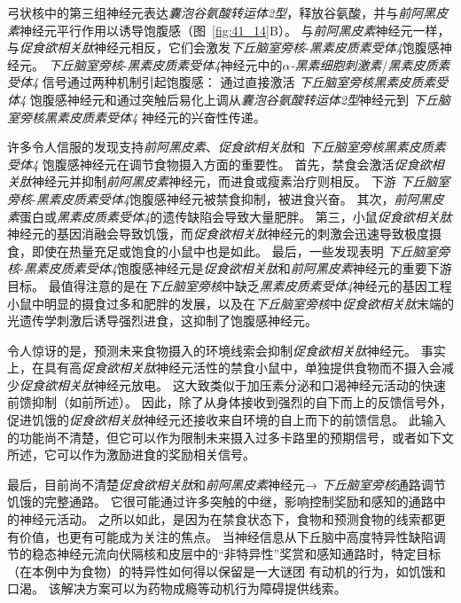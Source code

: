 弓状核中的第三组神经元表达\textit{囊泡谷氨酸转运体2型}，释放谷氨酸，并与\textit{前阿黑皮素}神经元平行作用以诱导饱腹感（图~\ref{fig:41_14}B）。
与\textit{前阿黑皮素}神经元一样，与\textit{促食欲相关肽}神经元相反，它们会激发\textit{下丘脑室旁核}-\textit{黑素皮质素受体4}饱腹感神经元。
\textit{下丘脑室旁核}-\textit{黑素皮质素受体4}神经元中的\textit{$\alpha$-黑素细胞刺激素}/\textit{黑素皮质素受体4} 信号通过两种机制引起饱腹感：
通过直接激活 \textit{下丘脑室旁核}\textit{黑素皮质素受体4} 饱腹感神经元和通过突触后易化上调从\textit{囊泡谷氨酸转运体2型}神经元到 \textit{下丘脑室旁核}\textit{黑素皮质素受体4} 神经元的兴奋性传递。


许多令人信服的发现支持\textit{前阿黑皮素}、\textit{促食欲相关肽}和 \textit{下丘脑室旁核}\textit{黑素皮质素受体4} 饱腹感神经元在调节食物摄入方面的重要性。
首先，禁食会激活\textit{促食欲相关肽}神经元并抑制\textit{前阿黑皮素}神经元，而进食或瘦素治疗则相反。
下游 \textit{下丘脑室旁核}-\textit{黑素皮质素受体4}饱腹感神经元被禁食抑制，被进食兴奋。
其次，\textit{前阿黑皮素}蛋白或\textit{黑素皮质素受体4}的遗传缺陷会导致大量肥胖。
第三，小鼠\textit{促食欲相关肽}神经元的基因消融会导致饥饿，而\textit{促食欲相关肽}神经元的刺激会迅速导致极度摄食，即使在热量充足或饱食的小鼠中也是如此。
最后，一些发现表明 \textit{下丘脑室旁核}-\textit{黑素皮质素受体4}饱腹感神经元是\textit{促食欲相关肽}和\textit{前阿黑皮素}神经元的重要下游目标。
最值得注意的是在\textit{下丘脑室旁核}中缺乏\textit{黑素皮质素受体4}神经元的基因工程小鼠中明显的摄食过多和肥胖的发展，以及在\textit{下丘脑室旁核}中\textit{促食欲相关肽}末端的光遗传学刺激后诱导强烈进食，这抑制了饱腹感神经元。


令人惊讶的是，预测未来食物摄入的环境线索会抑制\textit{促食欲相关肽}神经元。
事实上，在具有高\textit{促食欲相关肽}神经元活性的禁食小鼠中，单独提供食物而不摄入会减少\textit{促食欲相关肽}神经元放电。
这大致类似于加压素分泌和口渴神经元活动的快速前馈抑制（如前所述）。
因此，除了从身体接收到强烈的自下而上的反馈信号外，促进饥饿的\textit{促食欲相关肽}神经元还接收来自环境的自上而下的前馈信息。
此输入的功能尚不清楚，但它可以作为限制未来摄入过多卡路里的预期信号，或者如下文所述，它可以作为激励进食的奖励相关信号。


最后，目前尚不清楚\textit{促食欲相关肽}和\textit{前阿黑皮素}神经元→ \textit{下丘脑室旁核}通路调节饥饿的完整通路。
它很可能通过许多突触的中继，影响控制奖励和感知的通路中的神经元活动。
之所以如此，是因为在禁食状态下，食物和预测食物的线索都更有价值，也更有可能成为关注的焦点。
当神经信息从下丘脑中高度特异性缺陷调节的稳态神经元流向伏隔核和皮层中的“非特异性”奖赏和感知通路时，特定目标（在本例中为食物）的特异性如何得以保留是一大谜团 有动机的行为，如饥饿和口渴。
该解决方案可以为药物成瘾等动机行为障碍提供线索。


